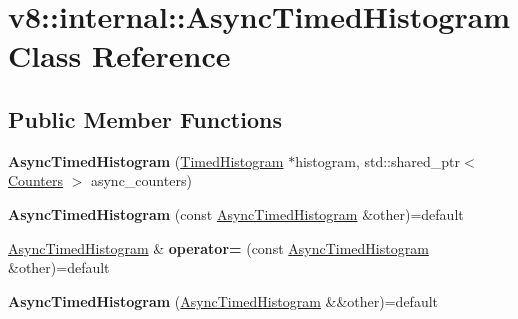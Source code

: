 \hypertarget{classv8_1_1internal_1_1AsyncTimedHistogram}{}\section{v8\+:\+:internal\+:\+:Async\+Timed\+Histogram Class Reference}
\label{classv8_1_1internal_1_1AsyncTimedHistogram}
\subsection*{Public Member Functions}
\begin{DoxyCompactItemize}
\item 
\mbox{\label{classv8_1_1internal_1_1AsyncTimedHistogram_af7f5aa88f75912f688150cc6b1ea4e7a}} 
{\bfseries Async\+Timed\+Histogram} (\mbox{\hyperlink{classv8_1_1internal_1_1TimedHistogram}{Timed\+Histogram}} $\ast$histogram, std\+::shared\+\_\+ptr$<$ \mbox{\hyperlink{classv8_1_1internal_1_1Counters}{Counters}} $>$ async\+\_\+counters)
\item 
\mbox{\label{classv8_1_1internal_1_1AsyncTimedHistogram_a3c68769b063b11bd3d97020edcc6ca31}} 
{\bfseries Async\+Timed\+Histogram} (const \mbox{\hyperlink{classv8_1_1internal_1_1AsyncTimedHistogram}{Async\+Timed\+Histogram}} \&other)=default
\item 
\mbox{\label{classv8_1_1internal_1_1AsyncTimedHistogram_a987bb4de96848d28cc60ba5797407682}} 
\mbox{\hyperlink{classv8_1_1internal_1_1AsyncTimedHistogram}{Async\+Timed\+Histogram}} \& {\bfseries operator=} (const \mbox{\hyperlink{classv8_1_1internal_1_1AsyncTimedHistogram}{Async\+Timed\+Histogram}} \&other)=default
\item 
\mbox{\label{classv8_1_1internal_1_1AsyncTimedHistogram_ae729fa12bdf83b28442a68d08a6bc392}} 
{\bfseries Async\+Timed\+Histogram} (\mbox{\hyperlink{classv8_1_1internal_1_1AsyncTimedHistogram}{Async\+Timed\+Histogram}} \&\&other)=default
\item 
\mbox{\label{classv8_1_1internal_1_1AsyncTimedHistogram_af2a08cc5514989ab4d51523ef7fcb28b}} 

\end{DoxyCompactItemize}
